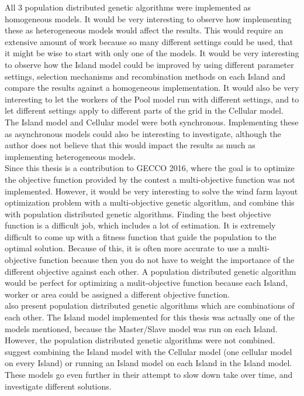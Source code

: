 \noindent All 3 population distributed genetic algorithms were implemented as homogeneous models. It would be very interesting to observe how implementing these as heterogeneous models would affect the results. This would require an extensive amount of work because so many different settings could be used, that it might be wise to start with only one of the models. It would be very interesting to observe how the Island model could be improved by using different parameter settings, selection mechanisms and recombination methods on each Island and compare the results against a homogeneous implementation. It would also be very interesting to let the workers of the Pool model run with different settings, and to let different settings apply to different parts of the grid in the Cellular model.\\


\noindent The Island model and Cellular model were both synchronous. Implementing these as asynchronous models could also be interesting to investigate, although the author does not believe that this would impact the results as much as implementing heterogeneous models.\\


\noindent Since this thesis is a contribution to GECCO 2016, where the goal is to optimize the objective function provided by the contest a multi-objective function was not implemented. However, it would be very interesting to solve the wind farm layout optimization problem with a multi-objective genetic algorithm, and combine this with population distributed genetic algorithms. Finding the best objective function is a difficult job, which includes a lot of estimation. It is extremely difficult to come up with a fitness function that guide the population to the optimal solution. Because of this, it is often more accurate to use a multi-objective function because then you do not have to weight the importance of the different objective against each other. A population distributed genetic algorithm would be perfect for optimizing a mulit-objective function because each Island, worker or area could be assigned a different objective function.\\


\noindent \citep{Gong} also present population distributed genetic algorithms which are combinations of each other. The Island model implemented for this thesis was actually one of the models mentioned, because the Master/Slave model was run on each Island. However, the population distributed genetic algorithms were not combined. \citep{Gong} suggest combining the Island model with the Cellular model (one cellular model on every Island) or running an Island model on each Island in the Island model. These models go even further in their attempt to slow down take over time, and investigate different solutions.\\


